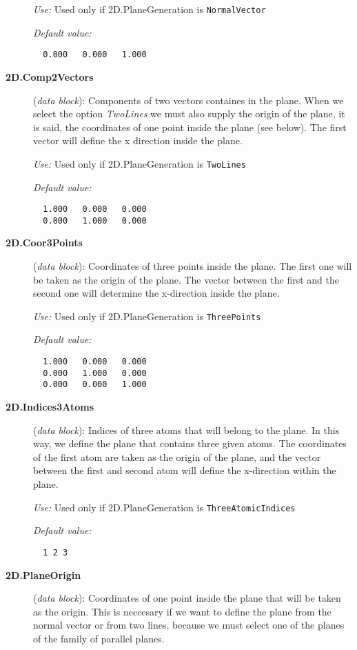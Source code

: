 \begin{description}
{\it Use:} Used only if 2D.PlaneGeneration is {\tt NormalVector}
    
{\it Default value:} 
\begin{verbatim}
  0.000   0.000   1.000
\end{verbatim}

\item[{\bf 2D.Comp2Vectors}] ({\it data block}): 
Components of two vectors containes in the plane. 
When we select the option {\it TwoLines} we must also supply the origin 
of the plane, it is said, the coordinates of one point inside the plane (see
below). The first vector will define the x direction inside the plane.

{\it Use:} Used only if 2D.PlaneGeneration is {\tt TwoLines}
    
{\it Default value:} 
\begin{verbatim}
  1.000   0.000   0.000
  0.000   1.000   0.000
\end{verbatim}

\item[{\bf 2D.Coor3Points}] ({\it data block}): 
Coordinates of three points inside the plane. The first one will be taken
as the origin of the plane. The vector between the first and the second one 
will determine the x-direction inside the plane.

{\it Use:} Used only if 2D.PlaneGeneration is {\tt ThreePoints}
    
{\it Default value:} 
\begin{verbatim}
  1.000   0.000   0.000
  0.000   1.000   0.000
  0.000   0.000   1.000
\end{verbatim}

\item[{\bf 2D.Indices3Atoms}] ({\it data block}): 
Indices of three atoms that will belong to the plane. In this way, we
define the plane that contains three given atoms. The coordinates
of the first atom are taken as the origin of the plane, 
and the vector between
the first and second atom will define the x-direction within
the plane.

{\it Use:} Used only if 2D.PlaneGeneration is {\tt ThreeAtomicIndices}
    
{\it Default value:} 
\begin{verbatim}
  1 2 3
\end{verbatim}

\item[{\bf 2D.PlaneOrigin}] ({\it data block}): 
Coordinates of one point inside the plane that will be taken as the origin. 
This is neccesary if we want to define the plane from the normal vector or
from two lines, because we must select one of the planes of the family of
parallel planes.


\end{description}
